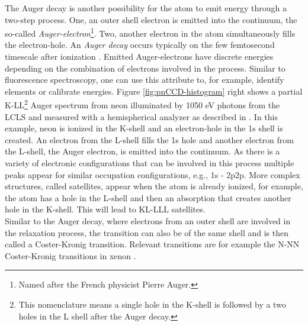 %
The Auger decay is another possibility for the atom to emit energy through a two-step process. One, an outer shell electron is emitted into the continuum, the so-called \textit{Auger-electron}\footnote{Named after the French physicist Pierre Auger.}. Two, another electron in the atom simultaneously fills the electron-hole. An \textit{Auger decay} occurs typically on the few femtosecond timescale after ionization \citep{Krause-1970-PhysLettA}. Emitted Auger-electrons have discrete energies depending on the combination of electrons involved in the process. Similar to fluorescence spectroscopy, one can use this attribute to, for example, identify elements or calibrate energies. Figure \ref{fig:pnCCD-histogram} right shows a partial K-LL\footnote{This nomenclature means a single hole in the K-shell is followed by a two holes in the L shell after the Auger decay.} Auger spectrum from neon illuminated by 1050 eV photons from the LCLS and measured with a hemispherical analyzer as described in \citep{Bucher-2014-Unpublished}. In this example, neon is ionized in the K-shell and an electron-hole in the 1s shell is created. An electron from the L-shell fills the 1s hole and another electron from the L-shell, the Auger electron, is emitted into the continuum. As there is a variety of electronic configurations that can be involved in this process multiple peaks appear for similar occupation configurations, e.g., 1s - 2p2p. More complex structures, called satellites, appear when the atom is already ionized, for example, the atom has a hole in the L-shell and then an absorption that creates another hole in the K-shell. This will lead to KL-LLL satellites.\\
Similar to the Auger decay, where electrons from an outer shell are involved in the relaxation process, the transition can also be of the same shell and is then called a Coster-Kronig transition. Relevant transitions are for example the N-NN Coster-Kronig transitions in xenon \citep{Coster-1935-Physica}.
%
%
%
%
